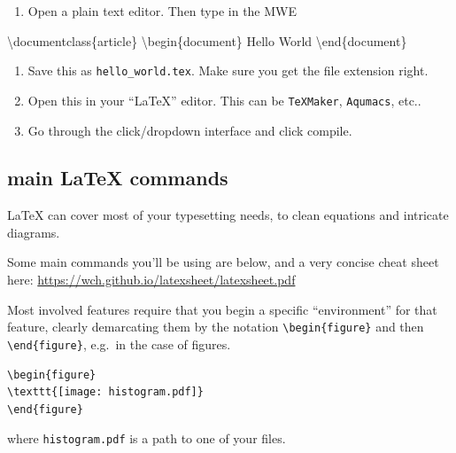 \documentclass[]{book}
\newenvironment{Shaded}{\begin{snugshade}}{\end{snugshade}}
\newcommand{\DataTypeTok}[1]{\textcolor[rgb]{0.13,0.29,0.53}{#1}}
\newcommand{\ExtensionTok}[1]{#1}
\newcommand{\NormalTok}[1]{#1}
\providecommand{\tightlist}{%
  \setlength{\itemsep}{0pt}\setlength{\parskip}{0pt}}
\theoremstyle{definition}
\theoremstyle{definition}
\theoremstyle{definition}
\theoremstyle{remark}
\begin{document}
\begin{enumerate}
\def\labelenumi{\arabic{enumi}.}
\tightlist
\item
  Open a plain text editor. Then type in the MWE
\end{enumerate}

\begin{Shaded}
\begin{Highlighting}[]
\NormalTok{\textbackslash{}}\ExtensionTok{documentclass}\DataTypeTok{\{article\}}
\NormalTok{\textbackslash{}}\ExtensionTok{begin}\DataTypeTok{\{document\}}
\ExtensionTok{Hello}\NormalTok{ World}
\NormalTok{\textbackslash{}}\ExtensionTok{end}\DataTypeTok{\{document\}}
\end{Highlighting}
\end{Shaded}

\begin{enumerate}
\def\labelenumi{\arabic{enumi}.}
\setcounter{enumi}{1}
\tightlist
\item
  Save this as \texttt{hello\_world.tex}. Make sure you get the file
  extension right.
\item
  Open this in your ``LaTeX'' editor. This can be \texttt{TeXMaker},
  \texttt{Aqumacs}, etc..
\item
  Go through the click/dropdown interface and click compile.
\end{enumerate}

\subsection{main LaTeX commands}\label{main-latex-commands}

LaTeX can cover most of your typesetting needs, to clean equations and
intricate diagrams.

Some main commands you'll be using are below, and a very concise cheat
sheet here: \url{https://wch.github.io/latexsheet/latexsheet.pdf}

Most involved features require that you begin a specific ``environment''
for that feature, clearly demarcating them by the notation
\texttt{\textbackslash{}begin\{figure\}} and then
\texttt{\textbackslash{}end\{figure\}}, e.g.~in the case of figures.

\begin{verbatim}
\begin{figure}
\texttt{[image: histogram.pdf]}
\end{figure}
\end{verbatim}

where \texttt{histogram.pdf} is a path to one of your files.
\end{document}
